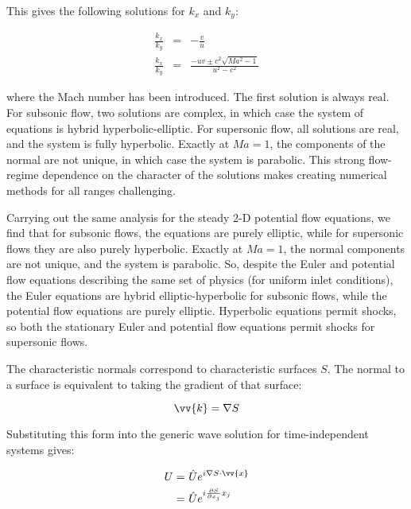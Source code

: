 \documentclass[10pt]{article}
\newcommand{\beq}{\begin{equation}}
\newcommand{\eeq}{\end{equation}}
\newcommand{\beqa}{\begin{equation}\begin{aligned}}
\newcommand{\eeqa}{\end{aligned}\end{equation}}
\begin{document}
\begin{flushleft}
This gives the following solutions for \(k_x\) and \(k_y\):

\begin{subequations}
\begin{eqnarray}
\frac{k_x}{k_y}&=&-\frac{v}{u}\\
\frac{k_x}{k_y}&=&\frac{-uv\pm c^2\sqrt{Ma^2-1}}{u^2-c^2}
\end{eqnarray}
\end{subequations}

where the Mach number has been introduced. The first solution is always real. For subsonic flow, two solutions are complex, in which case the system of equations is hybrid hyperbolic-elliptic. For supersonic flow, all solutions are real, and the system is fully hyperbolic. Exactly at \(Ma=1\), the components of the normal are not unique, in which case the system is parabolic. This strong flow-regime dependence on the character of the solutions makes creating numerical methods for all ranges challenging. 

Carrying out the same analysis for the steady 2-D potential flow equations, we find that for subsonic flows, the equations are purely elliptic, while for supersonic flows they are also purely hyperbolic. Exactly at \(Ma=1\), the normal components are not unique, and the system is parabolic. So, despite the Euler and potential flow equations describing the same set of physics (for uniform inlet conditions), the Euler equations are hybrid elliptic-hyperbolic for subsonic flows, while the potential flow equations are purely elliptic. Hyperbolic equations permit shocks, so both the stationary Euler and potential flow equations permit shocks for supersonic flows.

The characteristic normals correspond to characteristic surfaces \(S\). The normal to a surface is equivalent to taking the gradient of that surface:

\beq
\vv{k}=\nabla S
\eeq

Substituting this form into the generic wave solution for time-independent systems gives:

\beqa
U=&\ \hat{U}e^{i\nabla S\cdot\vv{x}}\\
=&\ \hat{U}e^{i\frac{\partial S}{\partial x_j}x_j}
\eeqa


\end{flushleft}
\end{document}
